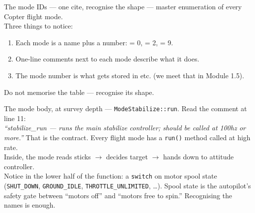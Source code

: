 \documentclass[aspectratio=169,11pt]{beamer}
\begin{document}
\begin{frame}{The mode IDs --- one cite, recognise the shape}
   --- master enumeration of every Copter flight mode.\\[1ex]
  Three things to notice:
  \begin{enumerate}
    \item Each mode is a name plus a number:  = 0,  = 2,  = 9.
    \item One-line comments next to each mode describe what it does.
    \item The mode number is what gets stored in  etc. (we meet that in Module 1.5).
  \end{enumerate}
  Do not memorise the table --- recognise its shape.
\end{frame}

\begin{frame}{The mode body, at survey depth}
   --- \texttt{ModeStabilize::run}. Read the comment at line 11:\\[0.5ex]
  \emph{``stabilize\_run --- runs the main stabilize controller; should be called at 100hz or more.''}
  \vfill
  That is the contract. Every flight mode has a \texttt{run()} method called at high rate.\\
  Inside, the mode reads sticks $\rightarrow$ decides target $\rightarrow$ hands down to attitude controller.\\[1ex]
  Notice in the lower half of the function: a \texttt{switch} on motor spool state (\texttt{SHUT\_DOWN}, \texttt{GROUND\_IDLE}, \texttt{THROTTLE\_UNLIMITED}, \dots). Spool state is the autopilot's safety gate between ``motors off'' and ``motors free to spin.'' Recognising the names is enough.
\end{frame}
\end{document}
